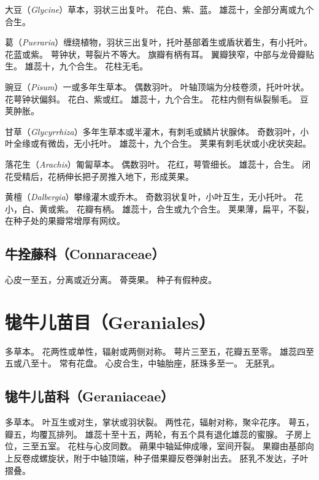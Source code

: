 \documentclass[11pt]{article}
\begin{document}
\begin{sloppypar}
\par

大豆（\textit{Glycine}）草本，羽状三出复叶。
花白、紫、蓝。
雄蕊十，全部分离或九个合生。

\par

葛（\textit{Pueraria}）缠绕植物，羽状三出复叶，托叶基部着生或盾状着生，有小托叶。
花蓝或紫。
萼钟状，萼裂片不等大。
旗瓣有柄有耳。
翼瓣狭窄，中部与龙骨瓣贴生。
雄蕊十，九个合生。
花柱无毛。

\par

豌豆（\textit{Pisum}）一或多年生草本。
偶数羽叶。
叶轴顶端为分枝卷须，托叶叶状。
花萼钟状偏斜。
花白、紫或红。
雄蕊十，九个合生。
花柱内侧有纵裂鬃毛。
豆荚肿胀。

\par

甘草（\textit{Glycyrrhiza}）多年生草本或半灌木，有刺毛或鳞片状腺体。
奇数羽叶，小叶全缘或有微齿，无小托叶。
雄蕊十，九个合生。
荚果有刺毛状或小疣状突起。

\par

落花生（\textit{Arachis}）匍匐草本。
偶数羽叶。
花红，萼管细长。
雄蕊十，合生。
闭花受精后，花柄伸长把子房推入地下，形成荚果。

\par

黄檀（\textit{Dalbergia}）攀缘灌木或乔木。
奇数羽状复叶，小叶互生，无小托叶。
花小，白、黄或紫。
花瓣有柄。
雄蕊十，合生或九个合生。
荚果薄，扁平，不裂，在种子处的果瓣常增厚有网纹。

\subsection{牛拴藤科（Connaraceae）}
心皮一至五，分离或近分离。
蓇葖果。
种子有假种皮。

\section{牻牛儿苗目（Geraniales）}
多草本。
花两性或单性，辐射或两侧对称。
萼片三至五，花瓣五至零。
雄蕊四至五或八至十。
常有花盘。
心皮合生，中轴胎座，胚珠多至一。
无胚乳。

\subsection{牻牛儿苗科（Geraniaceae）}
多草本。
叶互生或对生，掌状或羽状裂。
两性花，辐射对称，聚伞花序。
萼五，瓣五，均覆瓦排列。
雄蕊十至十五，两轮，有五个具有退化雄蕊的蜜腺。
子房上位，三至五室。
花柱与心皮同数。
蒴果中轴延伸成喙，室间开裂。
果瓣由基部向上反卷成螺旋状，附于中轴顶端，种子借果瓣反卷弹射出去。
胚乳不发达，子叶摺叠。


\end{sloppypar}
\end{document}
